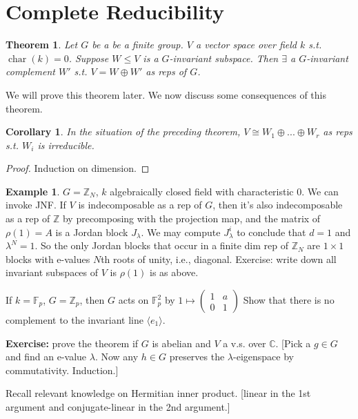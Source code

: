 \documentclass{article}
\theoremstyle{definition}
\newtheorem{example}[defn]{Example}
\theoremstyle{remark}
\theoremstyle{plain}
\newtheorem{thm}[defn]{Theorem}
\newtheorem{crly}[defn]{Corollary}
\newcommand{\ZZ}{\mathbb{Z}}
\newcommand{\CC}{\mathbb{C}}
\newcommand{\FF}{\mathbb{F}}
\begin{document}
\section{Complete Reducibility}
\begin{thm}
Let $G$ be a be a finite group. $V$ a vector space over field $k$ s.t. $\operatorname{char}(k)=0$. Suppose $W\le V$ is a $G$-invariant subspace. Then $\exists$ a $G$-invariant complement $W'$ s.t. $V=W\oplus W'$ as reps of $G$.
\end{thm}
We will prove this theorem later. We now discuss some consequences of this theorem.
\begin{crly}
    In the situation of the preceding theorem, $V\cong W_1\oplus...\oplus W_r$ as reps s.t. $W_i$ is irreducible.
\end{crly}
\begin{proof}
    Induction on dimension.
\end{proof}
\begin{example}
    $G=\ZZ_N$, $k$ algebraically closed field with characteristic $0$. We can invoke JNF.
     If $V$ is indecomposable as a rep of $G$, then it's also indecomposable as a rep of $\ZZ$ by precomposing with the projection map, and the matrix of $\rho(1)=A$ is a Jordan block $J_\lambda$. We may compute $J_\lambda^i$ to conclude that $d=1$ and $\lambda^N=1$. So the only Jordan blocks that occur in a finite dim rep of $\ZZ_N$ are $1\times 1$ blocks with e-values $N$th roots of unity, i.e., diagonal. Exercise: write down all invariant subspaces of $V$ is $\rho(1)$ is as above.

     If $k=\FF_p$, $G=\ZZ_p$, then $G$ acts on $\FF_p^2$ by $1\mapsto \begin{pmatrix}
         1&a\\0&1
     \end{pmatrix}$ Show that there is no complement to the invariant line $\langle e_1\rangle$.
\end{example}
\textbf{Exercise:}  prove the theorem if $G$ is abelian and $V$ a v.s. over $\CC$. [Pick a $g\in G$ and find an e-value $\lambda$. Now any $h\in G$ preserves the $\lambda$-eigenspace by commutativity. Induction.]

Recall relevant knowledge on Hermitian inner product. [linear in the 1st argument and conjugate-linear in the 2nd argument.]
\end{document}
